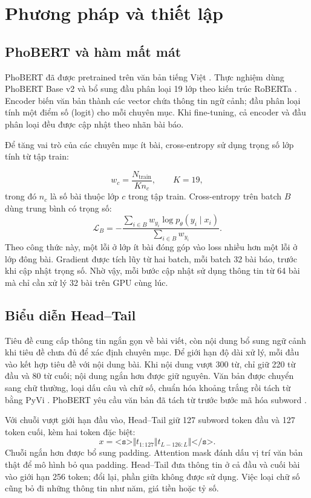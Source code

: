 \chapter{Phương pháp và thiết lập}
\section{PhoBERT và hàm mất mát}
PhoBERT đã được pretrained trên văn bản tiếng Việt \cite{phobert}. Thực nghiệm dùng PhoBERT Base v2 và bổ sung đầu phân loại 19 lớp theo kiến trúc RoBERTa \cite{phobert-v2}. Encoder biến văn bản thành các vector chứa thông tin ngữ cảnh; đầu phân loại tính một điểm số (logit) cho mỗi chuyên mục. Khi fine-tuning, cả encoder và đầu phân loại đều được cập nhật theo nhãn bài báo.

Để tăng vai trò của các chuyên mục ít bài, cross-entropy sử dụng trọng số lớp tính từ tập train:

\[
w_c=\frac{N_{\mathrm{train}}}{K n_c},\qquad K=19,
\]
trong đó $n_c$ là số bài thuộc lớp $c$ trong tập train. Cross-entropy trên batch $B$ dùng trung bình có trọng số:
\[
\mathcal{L}_B=-\frac{\sum_{i\in B}w_{y_i}\log p_\theta(y_i\mid x_i)}{\sum_{i\in B}w_{y_i}}.
\]
Theo công thức này, một lỗi ở lớp ít bài đóng góp vào loss nhiều hơn một lỗi ở lớp đông bài. Gradient được tích lũy từ hai batch, mỗi batch 32 bài báo, trước khi cập nhật trọng số. Nhờ vậy, mỗi bước cập nhật sử dụng thông tin từ 64 bài mà chỉ cần xử lý 32 bài trên GPU cùng lúc.

\section{Biểu diễn Head--Tail}
Tiêu đề cung cấp thông tin ngắn gọn về bài viết, còn nội dung bổ sung ngữ cảnh khi tiêu đề chưa đủ để xác định chuyên mục. Để giới hạn độ dài xử lý, mỗi đầu vào kết hợp tiêu đề với nội dung bài. Khi nội dung vượt 300 từ, chỉ giữ 220 từ đầu và 80 từ cuối; nội dung ngắn hơn được giữ nguyên. Văn bản được chuyển sang chữ thường, loại dấu câu và chữ số, chuẩn hóa khoảng trắng rồi tách từ bằng PyVi \cite{pyvi}. PhoBERT yêu cầu văn bản đã tách từ trước bước mã hóa subword \cite{phobert-v2}.

Với chuỗi vượt giới hạn đầu vào, Head--Tail giữ 127 subword token đầu và 127 token cuối, kèm hai token đặc biệt:
\[
x=\texttt{<s>}\Vert t_{1:127}\Vert t_{L-126:L}\Vert\texttt{</s>}.
\]
Chuỗi ngắn hơn được bổ sung padding. Attention mask đánh dấu vị trí văn bản thật để mô hình bỏ qua padding. Head--Tail đưa thông tin ở cả đầu và cuối bài vào giới hạn 256 token; đổi lại, phần giữa không được sử dụng. Việc loại chữ số cũng bỏ đi những thông tin như năm, giá tiền hoặc tỷ số.


